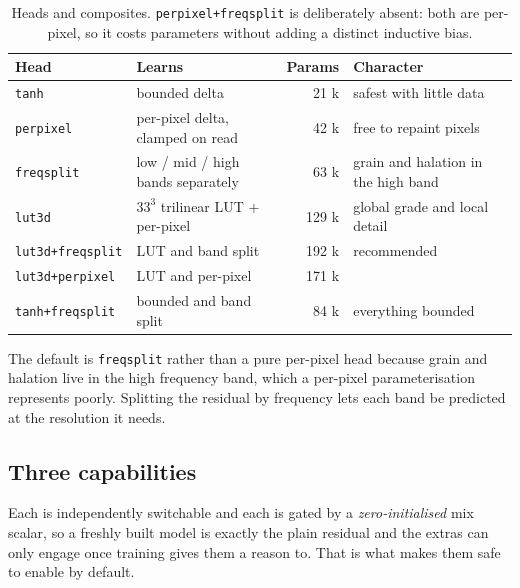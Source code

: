 \documentclass[11pt,a4paper]{article}
\newcommand{\code}[1]{\texttt{#1}}
\begin{document}
\begin{table}[h]
\centering
\small
\begin{tabular}{@{}llrl@{}}
\toprule
Head & Learns & Params & Character \\
\midrule
\code{tanh}       & bounded delta                      & 21 k  & safest with little data \\
\code{perpixel}   & per-pixel delta, clamped on read   & 42 k  & free to repaint pixels \\
\code{freqsplit}  & low / mid / high bands separately  & 63 k  & grain and halation in the high band \\
\code{lut3d}      & $33^3$ trilinear LUT $+$ per-pixel & 129 k & global grade and local detail \\
\midrule
\code{lut3d+freqsplit}  & LUT and band split           & 192 k & recommended \\
\code{lut3d+perpixel}   & LUT and per-pixel            & 171 k & \\
\code{tanh+freqsplit}   & bounded and band split       & 84 k  & everything bounded \\
\bottomrule
\end{tabular}
\normalsize
\caption{Heads and composites. \code{perpixel+freqsplit} is deliberately absent:
both are per-pixel, so it costs parameters without adding a distinct inductive
bias.}
\label{tab:heads}
\end{table}

The default is \code{freqsplit} rather than a pure per-pixel head because grain
and halation live in the high frequency band, which a per-pixel parameterisation
represents poorly. Splitting the residual by frequency lets each band be
predicted at the resolution it needs.

\subsection{Three capabilities}

Each is independently switchable and each is gated by a \emph{zero-initialised}
mix scalar, so a freshly built model is exactly the plain residual and the extras
can only engage once training gives them a reason to. That is what makes them safe
to enable by default.
\end{document}
